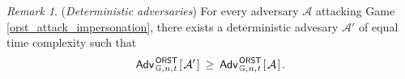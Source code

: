 \documentclass[10pt, psamsfonts, reqno]{amsart}
\theoremstyle{definition}
\theoremstyle{remark}
\newtheorem{rem}[thm]{Remark}
\numberwithin{equation}{section}
\begin{document}
\begin{rem}\label{rem_deterministic_adversaries}
(\textit{Deterministic adversaries})
\noindent
For every adversary $\mathcal{A}$
attacking Game \ref{orst_attack_impersonation},
there exists a deterministic advesary $\mathcal{A}'$
of equal time complexity such that
\vspace{5pt}
\begin{equation*}\label{deterministic_bound}
\mathsf{Adv}
	_{\hspace{1pt}\mathbb{G},\hspace{0.5pt} n,\hspace{0.5pt} t}
	^{\hspace{1pt}\mathsf{ORST}}
	\hspace{1pt}
		[\hspace{1pt}
			\mathcal{A}'
		\hspace{1pt}]
	\hspace{2pt}
	\ge
	\hspace{2pt}
	\mathsf{Adv}
	_{\hspace{1pt}\mathbb{G},\hspace{0.5pt} n,\hspace{0.5pt} t}
	^{\hspace{1pt}\mathsf{ORST}}
	\hspace{1pt}
		[\hspace{1pt}
			\mathcal{A}
		\hspace{1pt}]\hspace{1pt}.
\vspace{5pt}
\end{equation*}


\end{rem}
\end{document}
